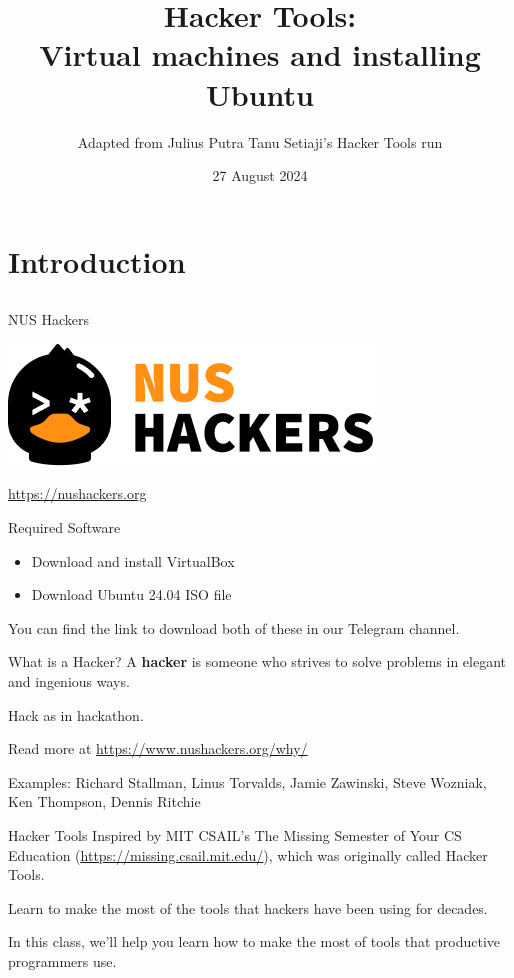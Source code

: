\documentclass[12pt]{beamer}
\title{Hacker Tools: \\Virtual machines and installing Ubuntu}
\author{Adapted from Julius Putra Tanu Setiaji's Hacker Tools run}
\date{27 August 2024}
\begin{document}
\begin{frame}[plain]
\titlepage
\end{frame}

\section{Introduction}
\subsection{}

\begin{frame}{NUS Hackers}

  \begin{center}
    \includegraphics[width=0.5\linewidth]{../NUSHackers}

    \url{https://nushackers.org}
  \end{center}

\end{frame}

\begin{frame}{Required Software}
  \begin{itemize}
    \item Download and install VirtualBox
    \item Download Ubuntu 24.04 ISO file
  \end{itemize}

  You can find the link to download both of these in our Telegram channel.
\end{frame}

\begin{frame}{What is a Hacker?}
  A \textbf{hacker} is someone who strives to solve problems in elegant and ingenious ways.

  Hack as in hackathon.

  Read more at \url{https://www.nushackers.org/why/}

  Examples: Richard Stallman, Linus Torvalds, Jamie Zawinski, Steve Wozniak, Ken Thompson, Dennis Ritchie
\end{frame}

\begin{frame}{Hacker Tools}
  Inspired by MIT CSAIL's The Missing Semester of Your CS Education (\url{https://missing.csail.mit.edu/}), which was originally called Hacker Tools.

  Learn to make the most of the tools that hackers have been using for decades.

  In this class, we'll help you learn how to make the most of tools that productive programmers use.
\end{frame}
\end{document}
